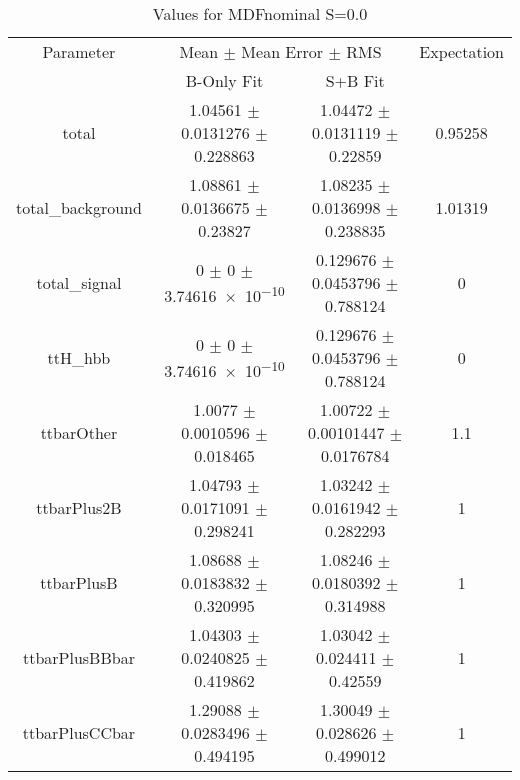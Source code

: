 \begin{table}
\centering
\caption{Values for MDFnominal S=0.0}
\begin{tabular}{cccc}
\toprule
Parameter & \multicolumn{2}{c}{Mean $\pm$ Mean Error $\pm$ RMS} & Expectation\\
 & B-Only Fit & S+B Fit & \\
\midrule
total & \num{1.04561} $\pm$ \num{0.0131276} $\pm$ \num{0.228863} & \num{1.04472} $\pm$ \num{0.0131119} $\pm$ \num{0.22859} & \num{0.95258}\\
total\_background & \num{1.08861} $\pm$ \num{0.0136675} $\pm$ \num{0.23827} & \num{1.08235} $\pm$ \num{0.0136998} $\pm$ \num{0.238835} & \num{1.01319}\\
total\_signal & \num{0} $\pm$ \num{0} $\pm$ \num{3.74616e-10} & \num{0.129676} $\pm$ \num{0.0453796} $\pm$ \num{0.788124} & \num{0}\\
ttH\_hbb & \num{0} $\pm$ \num{0} $\pm$ \num{3.74616e-10} & \num{0.129676} $\pm$ \num{0.0453796} $\pm$ \num{0.788124} & \num{0}\\
ttbarOther & \num{1.0077} $\pm$ \num{0.0010596} $\pm$ \num{0.018465} & \num{1.00722} $\pm$ \num{0.00101447} $\pm$ \num{0.0176784} & \num{1.1}\\
ttbarPlus2B & \num{1.04793} $\pm$ \num{0.0171091} $\pm$ \num{0.298241} & \num{1.03242} $\pm$ \num{0.0161942} $\pm$ \num{0.282293} & \num{1}\\
ttbarPlusB & \num{1.08688} $\pm$ \num{0.0183832} $\pm$ \num{0.320995} & \num{1.08246} $\pm$ \num{0.0180392} $\pm$ \num{0.314988} & \num{1}\\
ttbarPlusBBbar & \num{1.04303} $\pm$ \num{0.0240825} $\pm$ \num{0.419862} & \num{1.03042} $\pm$ \num{0.024411} $\pm$ \num{0.42559} & \num{1}\\
ttbarPlusCCbar & \num{1.29088} $\pm$ \num{0.0283496} $\pm$ \num{0.494195} & \num{1.30049} $\pm$ \num{0.028626} $\pm$ \num{0.499012} & \num{1}\\
\bottomrule
\end{tabular}
\end{table}